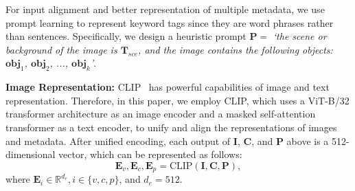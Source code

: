 For input alignment and better representation of multiple metadata,
we use prompt learning to represent keyword tags since they are word phrases rather than sentences. Specifically, we design a heuristic prompt $\bm{P} = $
\textit{`the scene or background of the image is $\bm{T}_{sce}$, and the image contains the following objects: $\bm{obj}_1$, $\bm{obj}_2$, ..., $\bm{obj}_k$'}.
% 

\textbf{Image Representation:}
CLIP~\cite{radford2021learning} has powerful capabilities of image and text representation. Therefore, in this paper, we employ CLIP, which uses a ViT-B/32 transformer architecture as an image encoder and a masked self-attention transformer as a text encoder, to unify and align the representations of images and metadata.
% 
After unified encoding, each output of $\bm{I}$, $\bm{C}$, and $\bm{P}$ above is a 512-dimensional vector, which can be represented as follows: 
\begin{equation}
    \bm{E}_v, \bm{E}_c, \bm{E}_p = \text{CLIP}(\bm{I, C, P}),
\end{equation}
where $\bm{E}_i \in \mathbb{R}^{d_e} , i \in \{ v, c, p \}$, and $d_e = 512$.

